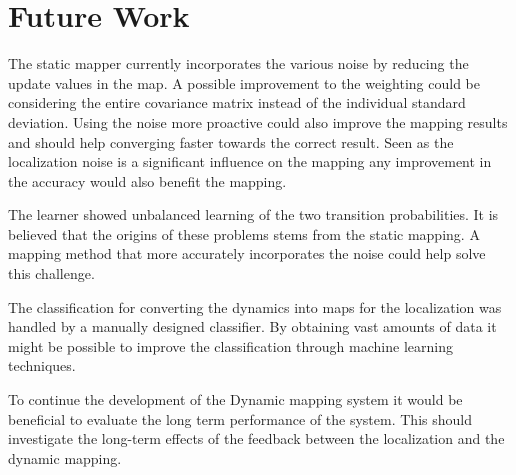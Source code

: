 \section{Future Work}

The static mapper currently incorporates the various noise by reducing the update values in the map. 
A possible improvement to the weighting could be considering the entire covariance matrix instead of the individual standard deviation. 
Using the noise more proactive could also improve the mapping results and should help converging faster towards the correct result.
Seen as the localization noise is a significant influence on the mapping any improvement in the accuracy would also benefit the mapping.


The learner showed unbalanced learning of the two transition probabilities.
It is believed that the origins of these problems stems from the static mapping. 
A mapping method that more accurately incorporates the noise could help solve this challenge. 


The classification for converting the dynamics into maps for the localization was handled by a manually designed classifier.
By obtaining vast amounts of data it might be possible to improve the classification through machine learning techniques. 


To continue the development of the Dynamic mapping system it would be beneficial to evaluate the long term performance of the system. 
This should investigate the long-term effects of the feedback between the localization and the dynamic mapping.